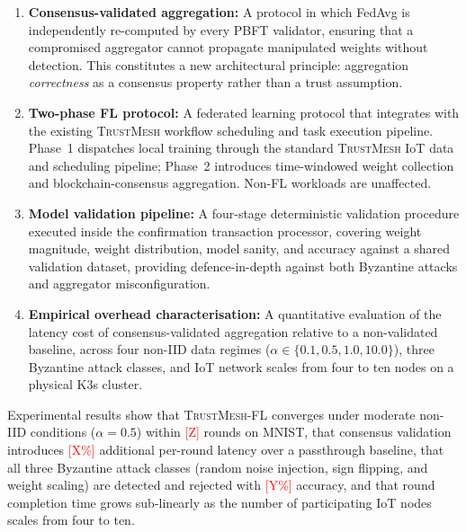 \documentclass[lettersize,journal]{IEEEtran}
\newcommand{\tmfl}{\textsc{TrustMesh-FL}}
\newcommand{\tm}{\textsc{TrustMesh}}
\begin{document}
\begin{enumerate}

    \item \textbf{Consensus-validated aggregation:} A protocol in which FedAvg is
    independently re-computed by every PBFT validator, ensuring that a compromised
    aggregator cannot propagate manipulated weights without detection. This constitutes
    a new architectural principle: aggregation \emph{correctness} as a consensus
    property rather than a trust assumption.

    \item \textbf{Two-phase FL protocol:} A federated learning protocol that integrates
    with the existing \tm{} workflow scheduling and task execution pipeline. Phase~1
    dispatches local training through the standard \tm{} IoT data and scheduling pipeline;
    Phase~2 introduces time-windowed weight collection and blockchain-consensus aggregation.
    Non-FL workloads are unaffected.

    \item \textbf{Model validation pipeline:} A four-stage deterministic validation
    procedure executed inside the confirmation transaction processor, covering weight
    magnitude, weight distribution, model sanity, and accuracy against a shared validation
    dataset, providing defence-in-depth against both Byzantine attacks and aggregator
    misconfiguration.

    \item \textbf{Empirical overhead characterisation:} A quantitative evaluation of the
    latency cost of consensus-validated aggregation relative to a non-validated baseline,
    across four non-IID data regimes ($\alpha \in \{0.1, 0.5, 1.0, 10.0\}$), three
    Byzantine attack classes, and IoT network scales from four to ten nodes on a physical
    K3s cluster.

\end{enumerate}

Experimental results show that \tmfl{} converges under moderate non-IID conditions
($\alpha = 0.5$) within \textcolor{red}{[Z]} rounds on MNIST, that consensus validation
introduces \textcolor{red}{[X\%]} additional per-round latency over a passthrough baseline,
that all three Byzantine attack classes (random noise injection, sign flipping, and weight
scaling) are detected and rejected with \textcolor{red}{[Y\%]} accuracy, and that round
completion time grows sub-linearly as the number of participating IoT nodes scales from
four to ten.
\end{document}
